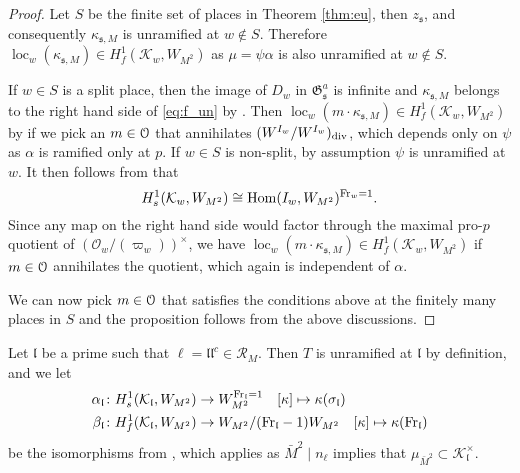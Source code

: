 \documentclass[leqno]{amsart}
\theoremstyle{definition}
\theoremstyle{remark}
\newcommand{\oo}{\mathcal{O}}
\newcommand{\eo}{\EuScript{O}}
\DeclareMathOperator{\Hom}{Hom}
\newcommand{\Fr}{\textnormal{Fr}} %
\newcommand{\fl}{\mathfrak{l}}
\newcommand{\fs}{\mathfrak{s}}
\newcommand{\K}{{\mathcal{K}}} %
\newcommand{\fG}{\mathfrak{G}}
\DeclareMathOperator{\loc}{loc}
\begin{document}
\begin{proof}

Let $S$ be the finite set of places in Theorem \ref{thm:eu},
then $z_\fs$, and consequently $\kappa_{\fs,M}$
is unramified at $w\notin S$.
Therefore $\loc_w(\kappa_{\fs, M})\in H^1_f(\K_w,W_{M^2})$
as $\mu=\psi\alpha$ is also unramified at $w\notin S$.


If $w\in S$ is a split place,
then the image of $D_w$ in $\fG_{\fs}^a$
is infinite and $\kappa_{\fs, M}$
belongs to the right hand side of \eqref{eq:f_un}
by \cite[Cor 4.6.2]{Rubin}.
Then $\loc_w(m\cdot \kappa_{\fs, M})\in H^1_f(\K_w, W_{M^2})$
by \cite[Cor 4.6.5]{Rubin}
if we pick an $m\in \eo$ that annihilates
$(W^{I_w}/W^{I_w})_{\textnormal{div}}$,
which depends only on $\psi$
as $\alpha$ is ramified only at $p$.
If $w\in S$ is non-split,
by assumption $\psi$ is unramified at $w$.
It then follows from \cite[Lem 1.3.2(ii)]{Rubin} that
\[
    H^1_s(\K_w,W_{M^2})\cong \Hom(I_w, W_{M^2})^{\Fr_w=1}.
\]
Since any map on the right hand side
would factor through the maximal pro-$p$
quotient of $(\oo_w/(\varpi_w))^\times$,
we have $\loc_w(m\cdot \kappa_{\fs,M})\in
H^1_f(\K_w,W_{M^2})$
if $m\in \eo$ annihilates the quotient,
which again is independent of $\alpha$.

We can now pick $m\in \eo$
that satisfies the conditions above
at the finitely many places in $S$
and the proposition follows from the above discussions.




\end{proof}


Let $\fl$ be a prime such that $\ell=\fl\fl^c\in \mathcal{R}_M$.
Then $T$ is unramified at $\fl$ by definition, and we let
\begin{align}
\alpha_\fl&\colon
H^1_s(\K_\fl,W_{M^2})\to W_{M^2}^{\Fr_\fl=1}\quad
[\kappa]\mapsto \kappa(\sigma_\fl)
\label{eq:singular} \\
\beta_\fl&\colon 
H^1_f(\K_\fl,W_{M^2})\to W_{M^2}/(\Fr_\fl-1)W_{M^2}\quad
[\kappa]\mapsto \kappa(\Fr_\fl)
\label{eq:finite}
\end{align}
be the isomorphisms from \cite[Lem 1.4.7]{Rubin}, which applies 
as $\bar{M}^2\mid n_\ell$ implies that
$\mu_{\bar{M}^2}\subset \K_\fl^\times$.
\end{document}
